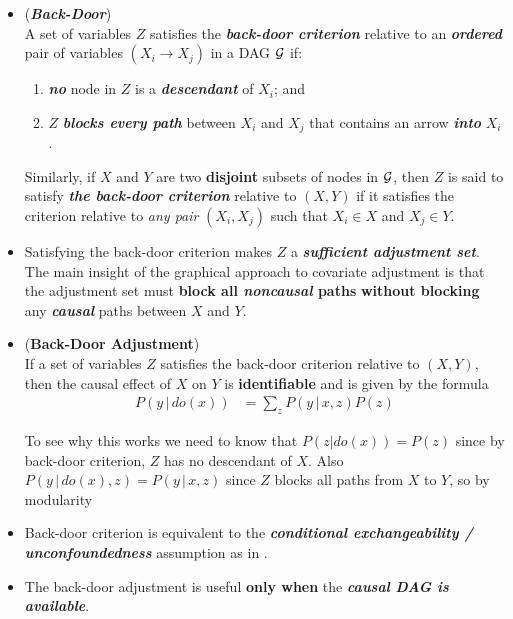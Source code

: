 \documentclass[11pt]{article}
\begin{document}
\begin{itemize}
\item 
\begin{definition}(\textbf{\emph{Back-Door}}) \citep{pearl2000causal}\\
A set of variables $Z$ satisfies the \emph{\textbf{back-door criterion}} relative to an \emph{\textbf{ordered}} pair of variables $(X_i \rightarrow X_j)$ in a DAG ${\mathcal G}$ if:
\begin{enumerate}
\item \emph{\textbf{no}} node in $Z$ is a \emph{\textbf{descendant}} of $X_i$; and
\item $Z$ \emph{\textbf{blocks every path}} between $X_i$ and $X_j$ that contains an arrow \textbf{\emph{into}} $X_i$.
\end{enumerate}
Similarly, if $X$ and $Y$ are two \textbf{disjoint} subsets of nodes in ${\mathcal G}$, then $Z$ is said to satisfy \textbf{\emph{the back-door criterion}} relative to $(X, Y)$ if it satisfies the criterion relative to \emph{any pair} $(X_i, X_j)$ such that $X_i \in X$ and $X_j \in Y$.
\end{definition} 

\item  Satisfying the back-door criterion makes $Z$ a \emph{\textbf{sufficient adjustment set}}. The main insight of the graphical approach to covariate adjustment is that the adjustment set must \textbf{block all \emph{noncausal} paths} \textbf{without blocking} any \emph{\textbf{causal}} paths between $X$ and $Y$. 

\item \begin{theorem} (\textbf{Back-Door Adjustment}) \citep{pearl2000causal, neal2020introduction}\\
If a set of variables $Z$ satisfies the back-door criterion relative to $(X, Y)$, then the causal effect of $X$ on $Y$ is \textbf{identifiable} and is given by the formula
\begin{align}
P(y\,|\, do(x)) &= \sum_{z}P(y\,|\,x,  z)P(z) \label{eqn: back_door_adjustment}
\end{align}
\end{theorem} To see why this works we need to know that $P(z| do(x)) = P(z)$ since by back-door criterion, $Z$ has no descendant of $X$. Also $P(y\,|\,do(x),  z) = P(y\,|\,x,  z)$ since $Z$ blocks all paths from $X$ to $Y$, so by modularity 

\item Back-door criterion is equivalent to the \emph{\textbf{conditional exchangeability / unconfoundedness}} assumption as in \citep{imbens2015causal}.

\item The back-door adjustment is useful \textbf{only when} the \emph{\textbf{causal DAG is available}}.
\end{itemize}
\end{document}
